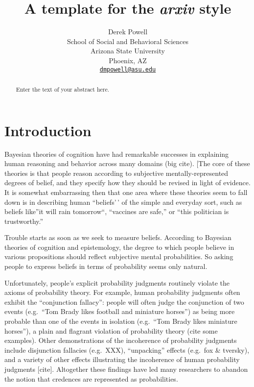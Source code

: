 \documentclass{article}
\title{A template for the \emph{arxiv} style}
\author{
    Derek Powell
   \\
    School of Social and Behavioral Sciences \\
    Arizona State University \\
  Phoenix, AZ \\
  \texttt{\href{mailto:dmpowell@asu.edu}{\nolinkurl{dmpowell@asu.edu}}} \\
  }
\begin{document}
\maketitle


\begin{abstract}
Enter the text of your abstract here.
\end{abstract}


\hypertarget{introduction}{%
\section{Introduction}\label{introduction}}

Bayesian theories of cognition have had remarkable successes in
explaining human reasoning and behavior across many domains (big cite).
{[}The core of these theories is that people reason according to
subjective mentally-represented degrees of belief, and they specify how
they should be revised in light of evidence. It is somewhat embarrassing
then that one area where these theories seem to fall down is in
describing human ``beliefs'\,' of the simple and everyday sort, such as
beliefs like''it will rain tomorrow``, ``vaccines are safe,'' or ``this
politician is trustworthy.''

Trouble starts as soon as we seek to measure beliefs. According to
Bayesian theories of cognition and epistemology, the degree to which
people believe in various propositions should reflect subjective mental
probabilities. So asking people to express beliefs in terms of
probability seems only natural.

Unfortunately, people's explicit probability judgments routinely violate
the axioms of probability theory. For example, human probability
judgments often exhibit the ``conjunction fallacy'': people will often
judge the conjunction of two events (e.g.~``Tom Brady likes football and
miniature horses'') as being more probable than one of the events in
isolation (e.g.~``Tom Brady likes miniature horses''), a plain and
flagrant violation of probability theory (cite some examples). Other
demonstrations of the incoherence of probability judgments include
disjunction fallacies (e.g.~XXX), ``unpacking'' effects (e.g.~fox \&
tversky), and a variety of other effects illustrating the incoherence of
human probability judgments {[}cite{]}. Altogether these findings have
led many researchers to abandon the notion that credences are
represented as probabilities.
\end{document}
